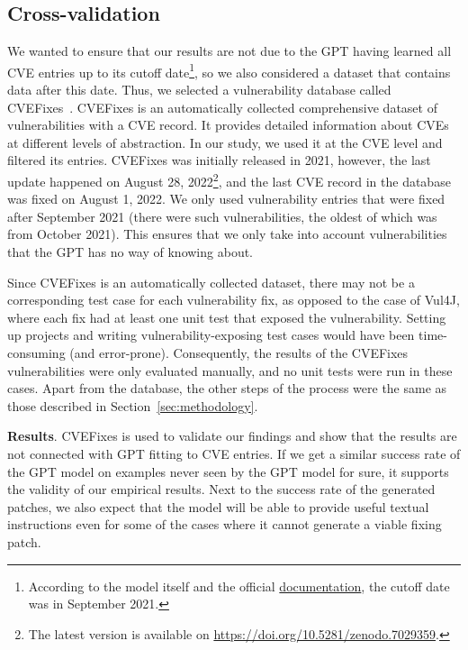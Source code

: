 \subsection{Cross-validation}

We wanted to ensure that our results are not due to the GPT having learned all CVE entries up to its cutoff date\footnote{According to the model itself and the official \href{https://web.archive.org/web/20231028225852/https://platform.openai.com/docs/models/gpt-4}{documentation}, the cutoff date was in September 2021.}, so we also considered a dataset that contains data after this date.
%
Thus, we selected a vulnerability database called CVEFixes~\cite{bhandari2021cvefixes}.
CVEFixes is an automatically collected comprehensive dataset of vulnerabilities with a CVE record.
It provides detailed information about CVEs at different levels of abstraction.
In our study, we used it at the CVE level and filtered its entries.
CVEFixes was initially released in 2021, however, the last update happened on August 28, 2022\footnote{The latest version is available on \href{https://zenodo.org/record/7029359}{https://doi.org/10.5281/zenodo.7029359}.}, and the last CVE record in the database was fixed on August 1, 2022.
We only used vulnerability entries that were fixed after September 2021 (there were \cvefixescount{} such vulnerabilities, the oldest of which was from October 2021).
This ensures that we only take into account vulnerabilities that the GPT has no way of knowing about.

Since CVEFixes is an automatically collected dataset, there may not be a corresponding test case for each vulnerability fix, as opposed to the case of Vul4J, where each fix had at least one unit test that exposed the vulnerability.
Setting up projects and writing vulnerability-exposing test cases would have been time-consuming (and error-prone).
Consequently, the results of the CVEFixes vulnerabilities were only evaluated manually, and no unit tests were run in these cases.
Apart from the database, the other steps of the process were the same as those described in Section~\ref{sec:methodology}.

\textbf{Results}.
CVEFixes is used to validate our findings and show that the results are not connected with GPT fitting to CVE entries.
If we get a similar success rate of the GPT model on examples never seen by the GPT model for sure, it supports the validity of our empirical results.
Next to the success rate of the generated patches, we also expect that the model will be able to provide useful textual instructions even for some of the cases where it cannot generate a viable fixing patch.

